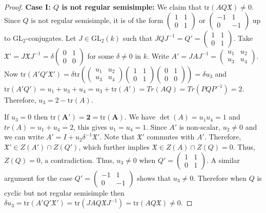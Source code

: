 \documentclass[10pt,twoside]{amsart}
\newcommand{\GL}{\mathrm{GL}}
\newcommand{\tr}{\mathrm{tr}}
\theoremstyle{definition}
\theoremstyle{definition}
\begin{document}
\begin{proof}
\noindent \textbf{Case I: $Q$ is not regular semisimple:} We claim that $\tr(AQ\mathfrak{X})\neq 0$. 
Since $Q$ is not regular semisimple, it is of the form $\left(\begin{array}{cc} 1 & 1 \\ 0 & 1 \end{array}\right)$ or $\left(\begin{array}{cc} -1 & 1 \\ 0 & -1 \end{array}\right)$ up to $\GL_2$-conjugates. Let $J\in \GL_2(k)$ such that $JQJ^{-1}=Q'=\left(\begin{array}{cc} 1 & 1 \\ 0 & 1 \end{array}\right)$. Take $\mathfrak{X}' = J \mathfrak{X}J^{-1} = \delta\left(\begin{array}{cc} 0 & 1 \\
0 & 0 \end{array}\right)$ for some $\delta \neq 0$ in $k$. Write $A' = JAJ^{-1} = \left(\begin{array}{cc} u_1 & u_2 \\ u_3 & u_4 \end{array}\right)$.        
Now $\tr(A'Q'\mathfrak{X}') = \delta \tr (\left(\begin{array}{cc}u_1 & u_2 \\ u_3 & u_4   \end{array} \right) \left(\begin{array}{cc} 1 & 1 \\ 0 & 1 \end{array}\right) \left(\begin{array}{cc} 0 & 1 \\ 0 & 0 \end{array}\right)) = \delta u_3$ and $\tr(A'Q') = u_1+u_3+u_4= u_3+\tr(A') = Tr(AQ) = Tr(PQP^{-1}) = 2$. Therefore, $u_3 = 2- \tr(A)$. 
        
If $u_3 = 0$ then $\mathbf{\tr(A') = 2 =\tr(A)}$. We have $\det(A) = u_1u_4 = 1$ and $tr(A) = u_1 + u_4 = 2$, this gives $u_1 = u_4 = 1$. Since $A'$ is non-scalar, $u_2\neq 0$ and we can write $A' = I + u_2 \delta^{-1}\mathfrak{X}'$. Note that $\mathfrak{X}'$ commutes with $A'$. Therefore, $\mathfrak{X}' \in Z(A') \cap Z(Q')$, which further implies $\mathfrak{X}\in Z(A) \cap Z(Q) = 0$. Thus, $Z(Q)=0$, a contradiction. Thus, $u_3\neq 0$ when $Q'=\left(\begin{array}{cc} 1 & 1 \\ 0 & 1
\end{array}\right)$. A similar argument for the case $Q' = \left(\begin{array}{cc} -1 & 1 \\ 0 & -1 \end{array}\right)$ shows that $u_3 \neq 0$. Therefore when $Q$ is cyclic but not regular semisimple then $\delta u_3 = \tr(A'Q'\mathfrak{X}') = \tr(JAQ\mathfrak{X}J^{-1})=\tr(AQ\mathfrak{X})\neq 0$. 


\end{proof}
\end{document}
